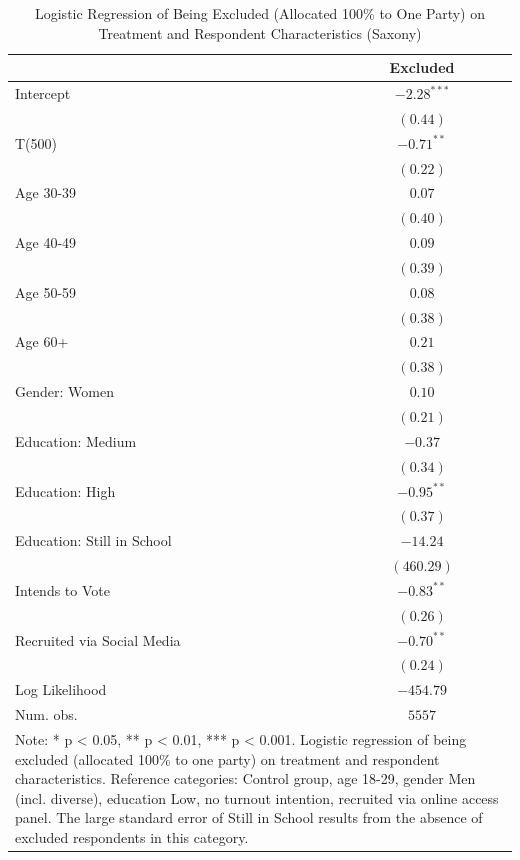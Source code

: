 
\begin{table}[t]
\captionsetup{skip=3pt}
\caption{Logistic Regression of Being Excluded (Allocated 100\% to One Party) on Treatment and Respondent Characteristics (Saxony)}
\centering
\footnotesize
\renewcommand{\arraystretch}{0.9}
\begin{tabular}{l c}
\toprule
 & Excluded \\
\midrule
Intercept                  & $-2.28^{***}$ \\
                           & $(0.44)$      \\
T(500)                     & $-0.71^{**}$  \\
                           & $(0.22)$      \\
Age 30-39                  & $0.07$        \\
                           & $(0.40)$      \\
Age 40-49                  & $0.09$        \\
                           & $(0.39)$      \\
Age 50-59                  & $0.08$        \\
                           & $(0.38)$      \\
Age 60+                    & $0.21$        \\
                           & $(0.38)$      \\
Gender: Women              & $0.10$        \\
                           & $(0.21)$      \\
Education: Medium          & $-0.37$       \\
                           & $(0.34)$      \\
Education: High            & $-0.95^{**}$  \\
                           & $(0.37)$      \\
Education: Still in School & $-14.24$      \\
                           & $(460.29)$    \\
Intends to Vote            & $-0.83^{**}$  \\
                           & $(0.26)$      \\
Recruited via Social Media & $-0.70^{**}$  \\
                           & $(0.24)$      \\
\midrule
Log Likelihood             & $-454.79$     \\
Num. obs.                  & $5557$        \\
\bottomrule
\multicolumn{2}{l}{\parbox{10cm}{\scriptsize{Note: * p < 0.05, ** p < 0.01, *** p < 0.001. Logistic regression of being excluded (allocated 100\% to one party) on treatment and respondent characteristics. Reference categories: Control group, age 18-29, gender Men (incl. diverse), education Low, no turnout intention, recruited via online access panel. The large standard error of Still in School results from the absence of excluded respondents in this category.}}}
\end{tabular}
\label{tab:excl_logit_saxony}
\end{table}
